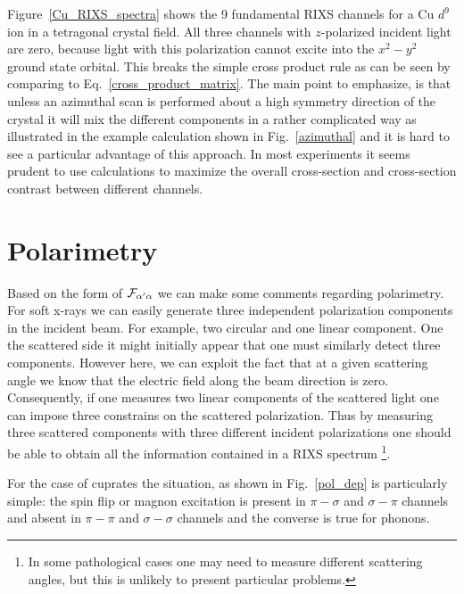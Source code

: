\documentclass[aps,onecolumn, notitlepage, longbibliography]{revtex4-1}
\begin{document}
Figure~\ref{Cu_RIXS_spectra} shows the 9 fundamental RIXS channels for a Cu $d^9$ ion in a tetragonal crystal field. All three channels with $z$-polarized incident light are zero, because light with this polarization cannot excite into the $x^2-y^2$ ground state orbital. This breaks the simple cross product rule as can be seen by comparing to Eq.~\ref{cross_product_matrix}. The main point to emphasize, is that unless an azimuthal scan is performed about a high symmetry direction of the crystal it will mix the different components in a rather complicated way as illustrated in the example calculation shown in Fig.~\ref{azimuthal} and it is hard to see a particular advantage of this approach. In most experiments it seems prudent to use calculations to maximize the overall cross-section and cross-section contrast between different channels. 

\section{Polarimetry}
Based on the form of ${\cal F}_{\alpha^\prime\alpha}$ we can make some comments regarding polarimetry. For soft x-rays we can easily generate three independent polarization components in the incident beam. For example, two circular and one linear component. One the scattered side it might initially appear that one must similarly detect three components. However here, we can exploit the fact that at a given scattering angle we know that the electric field along the beam direction is zero. Consequently, if one measures two linear components of the scattered light one can impose three constrains on the scattered polarization. Thus by measuring three scattered components with three different incident polarizations one should be able to obtain all the information contained in a RIXS spectrum \footnote{In some pathological cases one may need to measure different scattering angles, but this is unlikely to present particular problems.}. 

For the case of cuprates the situation, as shown in Fig.~\ref{pol_dep} is particularly simple: the spin flip or magnon excitation is present in $\pi-\sigma$ and $\sigma-\pi$ channels and absent in $\pi-\pi$ and $\sigma-\sigma$ channels and the converse is true for phonons. 
\end{document}
